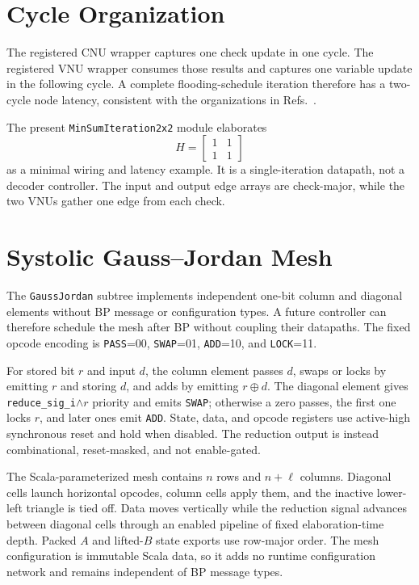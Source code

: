 \documentclass[10pt,conference]{IEEEtran}
\begin{document}
\section{Cycle Organization}
The registered CNU wrapper captures one check update in one cycle.  The
registered VNU wrapper consumes those results and captures one variable update
in the following cycle.  A complete flooding-schedule iteration therefore has
a two-cycle node latency, consistent with the organizations in
Refs.~\cite{valls2021,maurer2025}.

The present \texttt{MinSumIteration2x2} module elaborates
\begin{equation}
 H=\begin{bmatrix}1&1\\1&1\end{bmatrix}
\end{equation}
as a minimal wiring and latency example.  It is a single-iteration datapath,
not a decoder controller.  The input and output edge arrays are check-major,
while the two VNUs gather one edge from each check.

\section{Systolic Gauss--Jordan Mesh}
The \texttt{GaussJordan} subtree implements independent one-bit column and
diagonal elements without BP message or configuration types.  A future
controller can therefore schedule the mesh after BP without coupling their
datapaths.  The fixed opcode encoding is \texttt{PASS}=00,
\texttt{SWAP}=01, \texttt{ADD}=10, and \texttt{LOCK}=11.

For stored bit $r$ and input $d$, the column element passes $d$, swaps or locks
by emitting $r$ and storing $d$, and adds by emitting $r\oplus d$.  The
diagonal element gives \texttt{reduce\_sig\_i}\(\land r\) priority and emits
\texttt{SWAP}; otherwise a zero passes, the first one locks $r$, and later ones
emit \texttt{ADD}.  State, data, and opcode registers use active-high
synchronous reset and hold when disabled.  The reduction output is instead
combinational, reset-masked, and not enable-gated.

The Scala-parameterized mesh contains $n$ rows and $n+\ell$ columns.  Diagonal
cells launch horizontal opcodes, column cells apply them, and the inactive
lower-left triangle is tied off.  Data moves vertically while the reduction
signal advances between diagonal cells through an enabled pipeline of fixed
elaboration-time depth.  Packed $A$ and lifted-$B$ state exports use row-major
order.  The mesh configuration is immutable Scala data, so it adds no runtime
configuration network and remains independent of BP message types.
\end{document}
